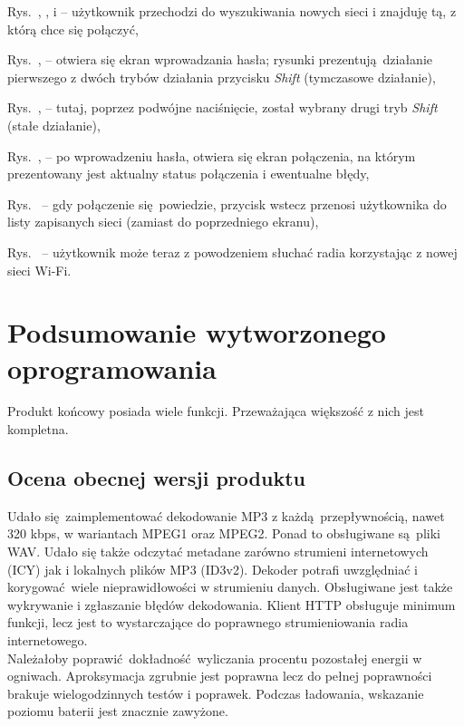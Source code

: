 \documentclass[polish]{aghengthesis}
\let\tempone\itemize
\let\temptwo\enditemize
\renewenvironment{itemize}{\tempone\setlength{\itemsep}{0cm}}{\temptwo}
\begin{document}
			\begin{itemize}
				\item Rys.~, ,  i  -- użytkownik przechodzi do wyszukiwania nowych sieci i znajduję tą, z którą chce się połączyć,
				\item Rys.~,  -- otwiera się ekran wprowadzania hasła; rysunki prezentują działanie pierwszego z dwóch trybów działania przycisku \textit{Shift} (tymczasowe działanie),
				\item Rys.~,  -- tutaj, poprzez podwójne naciśnięcie, został wybrany drugi tryb \textit{Shift} (stałe działanie),
				\item Rys.~,  -- po wprowadzeniu hasła, otwiera się ekran połączenia, na którym prezentowany jest aktualny status połączenia i ewentualne błędy,
				\item Rys.~ -- gdy połączenie się powiedzie, przycisk wstecz przenosi użytkownika do listy zapisanych sieci (zamiast do poprzedniego ekranu),
				\item Rys.~ -- użytkownik może teraz z powodzeniem słuchać radia korzystając z nowej sieci Wi-Fi.
			\end{itemize}
			
	\section{Podsumowanie wytworzonego oprogramowania}
		Produkt końcowy posiada wiele funkcji. Przeważająca większość z nich jest kompletna.
		
		\subsection{Ocena obecnej wersji produktu}
			Udało się zaimplementować dekodowanie MP3 z każdą przepływnością, nawet 320 kbps, w wariantach MPEG1 oraz MPEG2. Ponad to obsługiwane są pliki WAV. Udało się także odczytać metadane zarówno strumieni internetowych (ICY) jak i lokalnych plików MP3 (ID3v2). Dekoder potrafi uwzględniać i korygować wiele nieprawidłowości w strumieniu danych. Obsługiwane jest także wykrywanie i zgłaszanie błędów dekodowania. Klient HTTP obsługuje minimum funkcji, lecz jest to wystarczające do poprawnego strumieniowania radia internetowego.
			$ $\\
			
			Należałoby poprawić dokładność wyliczania procentu pozostałej energii w ogniwach. Aproksymacja zgrubnie jest poprawna lecz do pełnej poprawności brakuje wielogodzinnych testów i poprawek. Podczas ładowania, wskazanie poziomu baterii jest znacznie zawyżone.
			$ $\\
			
\end{document}
